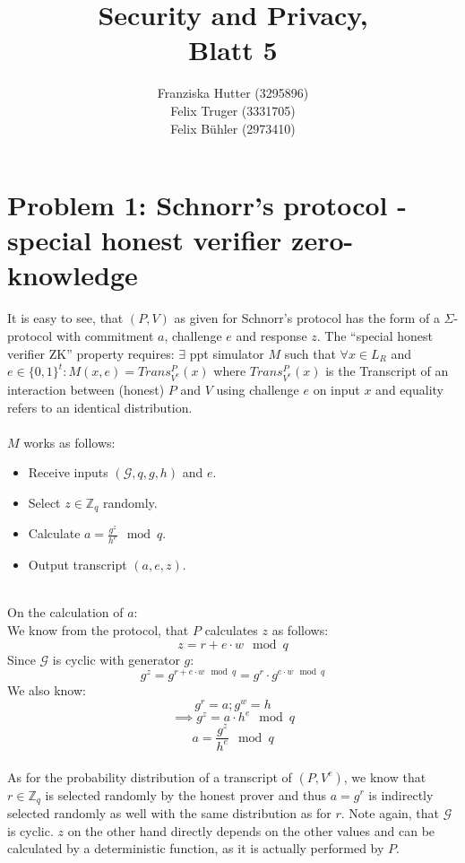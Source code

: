 \documentclass[12pt,pdftex,a4paper]{article}
\title{Security and Privacy,\\ Blatt 5}
\author{Franziska Hutter (3295896)\\
	Felix Truger (3331705)\\
	Felix Bühler (2973410)}
\begin{document}
\maketitle
\pagebreak

\section*{Problem 1: Schnorr’s protocol - special honest verifier zero-knowledge}


It is easy to see, that $(P, V)$ as given for Schnorr’s protocol has the form of a $\Sigma$-protocol with commitment $a$, challenge $e$ and response $z$.
The ``special honest verifier ZK'' property requires: $\exists$ ppt simulator $M$ such that $\forall x\in L_R$ and $e\in \{0,1\}^t: M(x, e) = Trans_{V^e}^P(x)$ where $Trans_{V^e}^P(x)$ is the Transcript of an interaction between (honest) $P$ and $V$ using challenge $e$ on input $x$ and equality refers to an identical distribution.
\\~\\
$M$ works as follows:
\begin{itemize}
\item Receive inputs $(\mathcal{G},q,g,h)$ and $e$.
\item Select $z\in\mathbb{Z}_q$ randomly.
\item Calculate $a = \frac{g^z}{h^e}\mod q$.
\item Output transcript $(a, e, z)$.
\end{itemize}\
\\
On the calculation of $a$:\\
We know from the protocol, that $P$ calculates $z$ as follows:
$$z=r+e\cdot w \mod q$$
Since $\mathcal{G}$ is cyclic with generator $g$:
$$g^z = g^{r+e\cdot w \mod q} = g^r \cdot g^{e\cdot w \mod q}$$
We also know:
$$g^r = a; g^w=h$$
$$\implies g^z = a \cdot h^e \mod q$$
$$a = \frac{g^z}{h^e} \mod q$$
\\
As for the probability distribution of a transcript of $(P,V^e)$, we know that $r\in \mathbb{Z}_q$ is selected randomly by the honest prover and thus $a = g^r$ is indirectly selected randomly as well with the same distribution as for $r$. Note again, that $\mathcal{G}$ is cyclic. $z$ on the other hand directly depends on the other values and can be calculated by a deterministic function, as it is actually performed by $P$.\\
\end{document}
